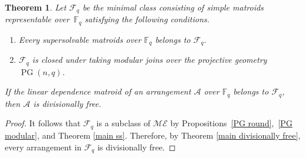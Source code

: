 \documentclass[pdftex]{sigma}
\numberwithin{equation}{section}
\newtheorem{Theorem}{Theorem}[section]
\DeclareMathOperator{\PG}{PG}
\begin{document}
\begin{Theorem}\label{main finite field}
Let $ \mathcal{F}_{q} $ be the minimal class consisting of simple matroids representable over~$ \mathbb{F}_{q} $ satisfying the following conditions.
\begin{enumerate}[$(i)$]\itemsep=0pt
\item Every supersolvable matroids over $ \mathbb{F}_{q} $ belongs to $ \mathcal{F}_{q} $.
\item $ \mathcal{F}_{q} $ is closed under taking modular joins over the projective geometry $ \PG(n,q) $.
\end{enumerate}
If the linear dependence matroid of an arrangement $ \mathcal{A} $ over $ \mathbb{F}_{q} $ belongs to $ \mathcal{F}_{q} $, then $ \mathcal{A} $ is divisionally free.
\end{Theorem}
\begin{proof}It follows that $ \mathcal{F}_{q} $ is a subclass of $ \mathcal{ME} $ by Propositions~\ref{PG round},~\ref{PG modular}, and Theorem \ref{main ss}.
Therefore, by Theorem \ref{main divisionally free}, every arrangement in $ \mathcal{F}_{q} $ is divisionally free.
\end{proof}
\end{document}
